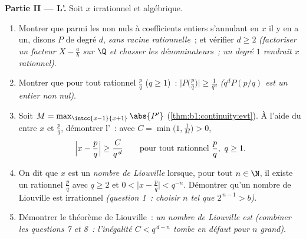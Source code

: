 \begin{problem}
\medskip
\noindent\textbf{Partie II --- L'.} Soit $x$
irrationnel et algébrique.
\begin{enumerate}[resume]
  \item Montrer que parmi les  non nuls à coefficients entiers
        s'annulant en $x$ il y en a un, disons $P$ de degré $d$,
        \emph{sans racine rationnelle}~; et vérifier $d \geq 2$
        \emph{(factoriser un facteur $X - \frac ab$ sur $\Q$ et
        chasser les dénominateurs~; un degré $1$ rendrait $x$
        rationnel)}.
  \item Montrer que pour tout rationnel $\frac pq$ ($q \geq 1$)~:
        $\bigl|P\bigl(\frac pq\bigr)\bigr| \geq \frac{1}{q^d}$
        \emph{($q^d P(p/q)$ est un entier non nul)}.
  \item Soit $M = \max_{\intcc{x-1}{x+1}} \abs{P'}$
        (\cref{thm:b1:continuity:evt}). À l'aide du  entre $x$ et $\frac pq$, démontrer
        l'\emph{}~: avec $C = \min\bigl(1,
        \frac 1M\bigr) > 0$,
        \[
        \Bigl| x - \frac pq \Bigr| \geq \frac{C}{q^{\,d}}
        \qquad\text{pour tout rationnel } \frac pq,\ q \geq 1 .
        \]
  \item On dit que $x$ est un \emph{nombre de Liouville} lorsque, pour tout $n \in
        \N$, il existe un rationnel $\frac pq$ avec $q \geq 2$ et
        $0 < \bigl|x - \frac pq\bigr| < q^{-n}$. Démontrer qu'un
        nombre de Liouville est irrationnel \emph{(question 1~: choisir
        $n$ tel que $2^{\,n-1} > b$)}.
  \item Démontrer le théorème de Liouville~: \emph{un nombre de Liouville est
        } \emph{(combiner les questions 7 et 8~: l'inégalité
        $C < q^{\,d-n}$ tombe en défaut pour $n$ grand)}.
\end{enumerate}


\end{problem}

